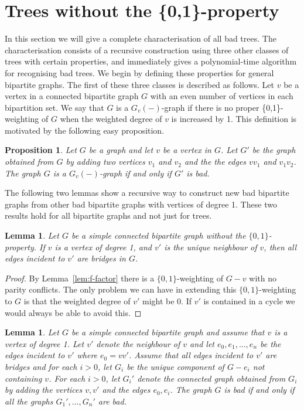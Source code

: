 \documentclass[
final,
 nomarks,
]{dmtcs-episciences}
\newtheorem{proposition}[theorem]{Proposition}
\newtheorem{lemma}[theorem]{Lemma}
\theoremstyle{definition}
\begin{document}
\section{Trees without the \{0,1\}-property} \label{sec2}
In this section we will give a complete characterisation of all bad trees. The characterisation consists of a recursive construction using three other classes of trees with certain properties, and immediately gives a polynomial-time algorithm for recognising bad trees. We begin by defining these properties for general bipartite graphs. The first of these three classes is described as follows. Let $v$ be a vertex in a connected bipartite graph $G$ with an even number of vertices in each bipartition set. We say that $G$ is a $G_v(-)$-graph if there is no proper \{0,1\}-weighting of $G$ when the weighted degree of $v$ is increased by 1. This definition is motivated by the following easy proposition.
\begin{proposition} \label{prop:-tree}
Let $G$ be a graph and let $v$ be a vertex in $G$. Let $G'$ be the graph obtained from $G$ by adding two vertices $v_1$ and $v_2$ and the the edges $vv_1$ and $v_1v_2$. The graph $G$ is a $G_v(-)$-graph if and only if $G'$ is bad.  
\end{proposition}
\noindent The following two lemmas show a recursive way to construct new bad bipartite graphs from other bad bipartite graphs with vertices of degree 1. These two results hold for all bipartite graphs and not just for trees.
\begin{lemma} \label{lem: degree1vbridge}
Let $G$ be a simple connected bipartite graph without the $\{0,1\}$-property. If $v$ is a vertex of degree 1, and $v'$ is the unique neighbour of $v$, then all edges incident to $v'$ are bridges in $G$. 
\end{lemma}
\begin{proof}
By Lemma~\ref{lem:f-factor} there is a $\{0,1\}$-weighting of $G-v$ with no parity conflicts. The only problem we can have in extending this $\{0,1\}$-weighting to $G$ is that the weighted degree of $v'$ might be 0. If $v'$ is contained in a cycle we would always be able to avoid this.
\end{proof}
\begin{lemma} \label{lem:degree1allbad}
Let $G$ be a simple connected bipartite graph and assume that $v$ is a vertex of degree 1. Let $v'$ denote the neighbour of $v$ and let $e_0,e_1,...,e_n$ be the edges incident to $v'$ where $e_0=vv'$. Assume that all edges incident to $v'$ are bridges and for each $i>0$, let $G_i$ be the unique component of $G-e_i$ not containing $v$. For each $i>0$, let $G_i'$ denote the connected graph obtained from $G_i$ by adding the vertices $v, v'$ and the edges $e_0,e_i$. The graph $G$ is bad if and only if all the graphs $G_1',...,G_n'$ are bad.
\end{lemma}
\end{document}
